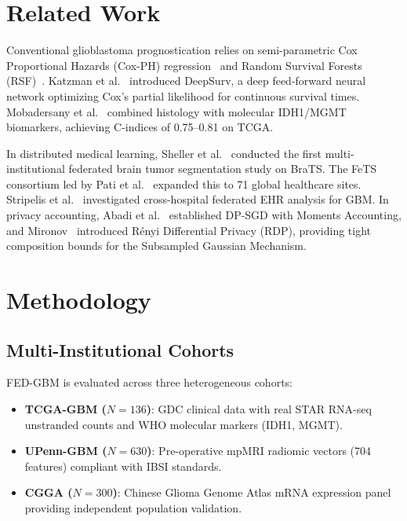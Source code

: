 \documentclass[journal,10pt,twocolumn]{IEEEtran}
\begin{document}
\section{Related Work}
Conventional glioblastoma prognostication relies on semi-parametric Cox Proportional Hazards (Cox-PH) regression~\cite{cox1972regression} and Random Survival Forests (RSF)~\cite{ishwaran2008random}. Katzman et al.~\cite{katzman2018deepsurv} introduced DeepSurv, a deep feed-forward neural network optimizing Cox's partial likelihood for continuous survival times. Mobadersany et al.~\cite{mobadersany2018predicting} combined histology with molecular IDH1/MGMT biomarkers, achieving C-indices of 0.75--0.81 on TCGA.

In distributed medical learning, Sheller et al.~\cite{sheller2019multi} conducted the first multi-institutional federated brain tumor segmentation study on BraTS. The FeTS consortium led by Pati et al.~\cite{pati2022federated} expanded this to 71 global healthcare sites. Stripelis et al.~\cite{stripelis2024federated} investigated cross-hospital federated EHR analysis for GBM. In privacy accounting, Abadi et al.~\cite{abadi2016deep} established DP-SGD with Moments Accounting, and Mironov~\cite{mironov2017renyi} introduced R\'enyi Differential Privacy (RDP), providing tight composition bounds for the Subsampled Gaussian Mechanism.

\section{Methodology}

\subsection{Multi-Institutional Cohorts}
FED-GBM is evaluated across three heterogeneous cohorts:
\begin{itemize}
    \item \textbf{TCGA-GBM ($N=136$)}: GDC clinical data with real STAR RNA-seq unstranded counts and WHO molecular markers (IDH1, MGMT).
    \item \textbf{UPenn-GBM ($N=630$)}: Pre-operative mpMRI radiomic vectors (704 features) compliant with IBSI standards.
    \item \textbf{CGGA ($N=300$)}: Chinese Glioma Genome Atlas mRNA expression panel providing independent population validation.
\end{itemize}
\end{document}
